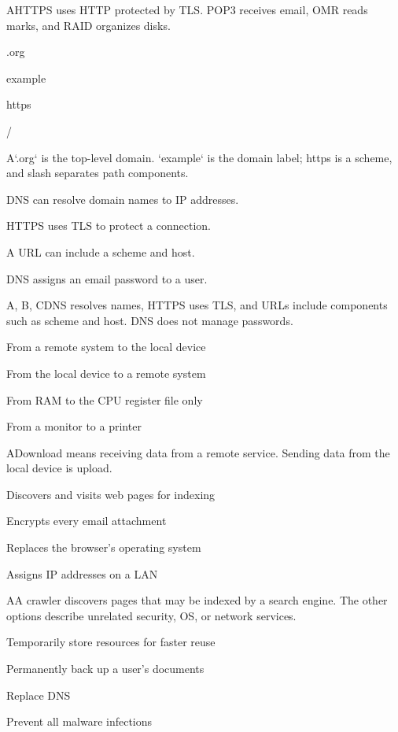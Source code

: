\begin{enumerate}[label=\textbf{Q\arabic*.}, leftmargin=*]
  {A}{HTTPS uses HTTP protected by TLS. POP3 receives email, OMR reads marks, and RAID organizes disks.}
  {\item .org
   \item example
   \item https
   \item /}
  {A}{`.org` is the top-level domain. `example` is the domain label; https is a scheme, and slash separates path components.}
  {\item DNS can resolve domain names to IP addresses.
   \item HTTPS uses TLS to protect a connection.
   \item A URL can include a scheme and host.
   \item DNS assigns an email password to a user.}
  {A, B, C}{DNS resolves names, HTTPS uses TLS, and URLs include components such as scheme and host. DNS does not manage passwords.}
\fi
\ifnum{}
  {\item From a remote system to the local device
   \item From the local device to a remote system
   \item From RAM to the CPU register file only
   \item From a monitor to a printer}
  {A}{Download means receiving data from a remote service. Sending data from the local device is upload.}
  {\item Discovers and visits web pages for indexing
   \item Encrypts every email attachment
   \item Replaces the browser's operating system
   \item Assigns IP addresses on a LAN}
  {A}{A crawler discovers pages that may be indexed by a search engine. The other options describe unrelated security, OS, or network services.}
  {\item Temporarily store resources for faster reuse
   \item Permanently back up a user's documents
   \item Replace DNS
   \item Prevent all malware infections}

\end{enumerate}
